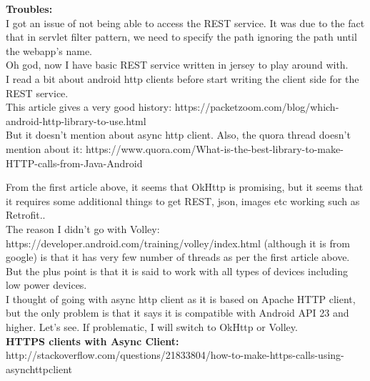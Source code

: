 \documentclass[11pt]{article}
\begin{document}
\textbf{Troubles:}\\
I got an issue of not being able to access the REST service. It was due to the fact that in servlet filter pattern, we need to specify the path 
ignoring the path until the webapp's name.\\

Oh god, now I have basic REST service written in jersey to play around with.\\

I read a bit about android http clients before start writing the client side for the REST service.\\
This article gives a very good history: https://packetzoom.com/blog/which-android-http-library-to-use.html\\
But it doesn't mention about async http client. Also, the quora thread doesn't mention about it: 
https://www.quora.com/What-is-the-best-library-to-make-HTTP-calls-from-Java-Android

From the first article above, it seems that OkHttp is promising, but it seems that it requires some additional things to get REST, json, images etc 
working such as Retrofit..\\

The reason I didn't go with Volley: https://developer.android.com/training/volley/index.html (although it is from google) is that it has very few 
number of threads as per the first article above. But the plus point is that it is said to work with all types of devices including low power 
devices.\\

I thought of going with async http client as it is based on Apache HTTP client, but the only problem is that it says it is compatible with Android 
API 23 and higher. Let's see. If problematic, I will switch to OkHttp or Volley.\\

\textbf{HTTPS clients with Async Client:}\\
http://stackoverflow.com/questions/21833804/how-to-make-https-calls-using-asynchttpclient\\
\end{document}

